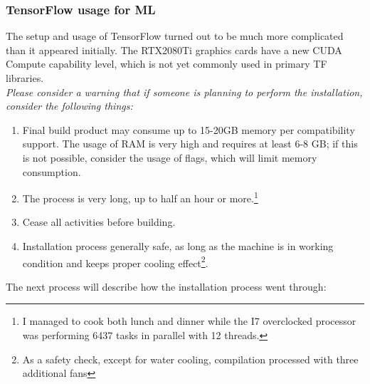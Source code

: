 \subsubsection{TensorFlow usage for ML}
The setup and usage of TensorFlow turned out to be much more complicated than it appeared initially.
The RTX2080Ti graphics cards have a new CUDA Compute capability level, which is not yet commonly used in primary TF libraries.  \\
\textit{Please consider a warning that if someone is planning to perform the installation, consider the following things:}
\begin{enumerate}
    \item Final build product may consume up to 15-20GB memory per compatibility support. 
The usage of RAM is very high and requires at least 6-8 GB; if this is not possible, consider the usage of flags, which will limit memory consumption.
    \item The process is very long, up to half an hour or more.\footnote{I managed to cook both lunch and dinner while the I7 overclocked processor was performing 6437 tasks in parallel with 12 threads.}
    \item Cease all activities before building.
    \item Installation process generally safe, as long as the machine is in working condition and keeps proper cooling effect\footnote{As a safety check, except for water cooling, compilation processed with three additional fans}.
\end{enumerate}
The next process will describe how the installation process went through:
